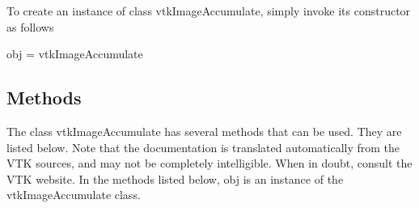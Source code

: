 To create an instance of class vtk\-Image\-Accumulate, simply invoke its constructor as follows \begin{DoxyVerb}  obj = vtkImageAccumulate
\end{DoxyVerb}
 \hypertarget{vtkwidgets_vtkxyplotwidget_Methods}{}\subsection{Methods}\label{vtkwidgets_vtkxyplotwidget_Methods}
The class vtk\-Image\-Accumulate has several methods that can be used. They are listed below. Note that the documentation is translated automatically from the V\-T\-K sources, and may not be completely intelligible. When in doubt, consult the V\-T\-K website. In the methods listed below, {\ttfamily obj} is an instance of the vtk\-Image\-Accumulate class. 
